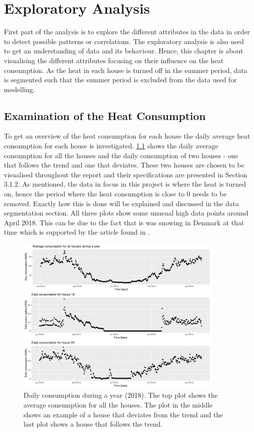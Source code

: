 \chapter{Exploratory Analysis}
\label{chap: exploratory}
First part of the analysis is to explore the different attributes in the data in order to detect possible patterns or correlations. The exploratory analysis is also used to get an understanding of data and its behaviour. Hence, this chapter is about visualising the different attributes focusing on their influence on the heat consumption. As the heat in each house is turned off in the summer period, data is segmented such that the summer period is excluded from the data used for modelling. 

\section{Examination of the Heat Consumption}
To get an overview of the heat consumption for each house the daily average heat consumption for each house is investigated. \cref{fig: daily_cons} shows the daily average consumption for all the houses and the daily consumption of two houses - one that follows the trend and one that deviates. These two houses are chosen to be visualised throughout the report and their specifications are presented in Section 3.1.2. As mentioned, the data in focus in this project is where the heat is turned on, hence the period where the heat consumption is close to 0 needs to be removed. Exactly how this is done will be explained and discussed in the data segmentation section. All three plots show some unusual high data points around April 2018. This can be due to the fact that is was snowing in Denmark at that time which is supported by the article found in \cite{vejr2018}. 
\begin{figure}[ht]
    \centering
    \includegraphics[width=0.9\textwidth]{../../../figures/daily_cons.pdf}
    \caption{Daily consumption during a year (2018). The top plot shows the average consumption for all the houses. The plot in the middle shows an example of a house that deviates from the trend and the last plot shows a house that follows the trend.}
    \label{fig: daily_cons}
\end{figure}

